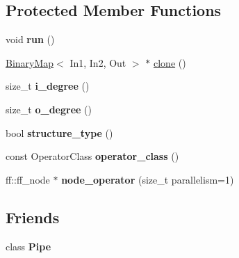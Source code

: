 \subsection*{\-Protected \-Member \-Functions}
\begin{DoxyCompactItemize}
\item 
\hypertarget{class_binary_map_a4cb82813b17f67bc603e588b8590c315}{void {\bfseries run} ()}\label{class_binary_map_a4cb82813b17f67bc603e588b8590c315}

\item 
\hyperlink{class_binary_map}{\-Binary\-Map}$<$ \-In1, \-In2, \-Out $>$ $\ast$ \hyperlink{class_binary_map_a5ee518543d1593d6ae4a443b95461f70}{clone} ()
\item 
\hypertarget{class_binary_map_ab57a24e23e0a80e17f6b6a8bf2461d0e}{size\-\_\-t {\bfseries i\-\_\-degree} ()}\label{class_binary_map_ab57a24e23e0a80e17f6b6a8bf2461d0e}

\item 
\hypertarget{class_binary_map_a797b1d9ba0e907ed25865315e7e0dc1a}{size\-\_\-t {\bfseries o\-\_\-degree} ()}\label{class_binary_map_a797b1d9ba0e907ed25865315e7e0dc1a}

\item 
\hypertarget{class_binary_map_a2c00076ce44f296a9fc41994c2e3e162}{bool {\bfseries structure\-\_\-type} ()}\label{class_binary_map_a2c00076ce44f296a9fc41994c2e3e162}

\item 
\hypertarget{class_binary_map_a41145194d0d78b9eb3ad0b35ebd30da2}{const \-Operator\-Class {\bfseries operator\-\_\-class} ()}\label{class_binary_map_a41145194d0d78b9eb3ad0b35ebd30da2}

\item 
\hypertarget{class_binary_map_a25c286d36f6145f22ea5cf171b07103e}{ff\-::ff\-\_\-node $\ast$ {\bfseries node\-\_\-operator} (size\-\_\-t parallelism=1)}\label{class_binary_map_a25c286d36f6145f22ea5cf171b07103e}

\end{DoxyCompactItemize}
\subsection*{\-Friends}
\begin{DoxyCompactItemize}
\item 
\hypertarget{class_binary_map_adb788d0aa2d64624d3602a985936d7da}{class {\bfseries \-Pipe}}\label{class_binary_map_adb788d0aa2d64624d3602a985936d7da}

\end{DoxyCompactItemize}


